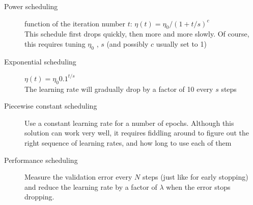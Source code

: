 \documentclass[french]{article}
\begin{document}
\begin{description}
    \item[Power scheduling] function of the iteration number $t$: $\eta(t) = \eta_0 / (1+ t/s)^c$ \\
      This schedule first drops quickly, then more and more slowly. Of course, this requires tuning $\eta_0$ , $s$ (and possibly $c$ usually set to 1)
    \item[Exponential scheduling] $\eta(t) = \eta_0 0.1^{t/s}$ \\
    The learning rate will gradually drop by a factor of 10 every $s$ steps
    \item[Piecewise constant scheduling] Use a constant learning rate for a number of epochs. Although this solution can work very well, it requires fiddling around to figure out the right sequence of learning rates, and how long to use each of them
    \item[Performance scheduling] Measure the validation error every $N$ steps (just like for early stopping) and reduce the learning rate by a factor of $\lambda$ when the error stops dropping.
\end{description}
\end{document}
